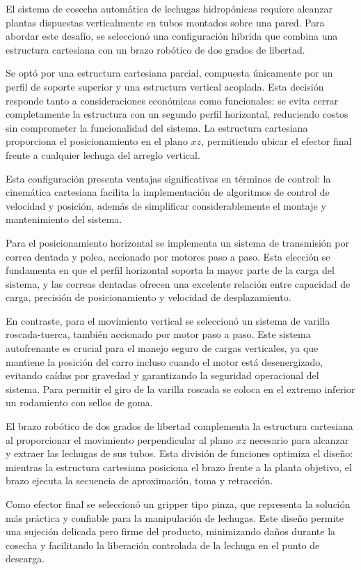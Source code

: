 El sistema de cosecha automática de lechugas hidropónicas requiere alcanzar plantas dispuestas verticalmente en tubos montados sobre una pared. Para abordar este desafío, se seleccionó una configuración híbrida que combina una estructura cartesiana con un brazo robótico de dos grados de libertad.

Se optó por una estructura cartesiana parcial, compuesta únicamente por un perfil de soporte superior y una estructura vertical acoplada. Esta decisión responde tanto a consideraciones económicas como funcionales: se evita cerrar completamente la estructura con un segundo perfil horizontal, reduciendo costos sin comprometer la funcionalidad del sistema. La estructura cartesiana proporciona el posicionamiento en el plano $xz$, permitiendo ubicar el efector final frente a cualquier lechuga del arreglo vertical.

Esta configuración presenta ventajas significativas en términos de control: la cinemática cartesiana facilita la implementación de algoritmos de control de velocidad y posición, además de simplificar considerablemente el montaje y mantenimiento del sistema.

Para el posicionamiento horizontal se implementa un sistema de transmisión por correa dentada y polea, accionado por motores paso a paso. Esta elección se fundamenta en que el perfil horizontal soporta la mayor parte de la carga del sistema, y las correas dentadas ofrecen una excelente relación entre capacidad de carga, precisión de posicionamiento y velocidad de desplazamiento.

En contraste, para el movimiento vertical se seleccionó un sistema de varilla roscada-tuerca, también accionado por motor paso a paso. Este sistema autofrenante es crucial para el manejo seguro de cargas verticales, ya que mantiene la posición del carro incluso cuando el motor está desenergizado, evitando caídas por gravedad y garantizando la seguridad operacional del sistema. Para permitir el giro de la varilla roscada se coloca en el extremo inferior un rodamiento con sellos de goma.

El brazo robótico de dos grados de libertad complementa la estructura cartesiana al proporcionar el movimiento perpendicular al plano $xz$ necesario para alcanzar y extraer las lechugas de sus tubos. Esta división de funciones optimiza el diseño: mientras la estructura cartesiana posiciona el brazo frente a la planta objetivo, el brazo ejecuta la secuencia de aproximación, toma y retracción.

Como efector final se seleccionó un gripper tipo pinza, que representa la solución más práctica y confiable para la manipulación de lechugas. Este diseño permite una sujeción delicada pero firme del producto, minimizando daños durante la cosecha y facilitando la liberación controlada de la lechuga en el punto de descarga.

